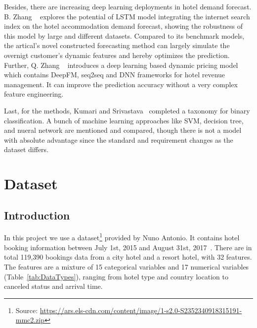 \documentclass[10pt,twocolumn,letterpaper]{article}
\begin{document}
Besides, there are increasing deep learning deployments in hotel demand forecast. B. Zhang \etal~\cite{zhang2019forecasting} explores the potential of LSTM model integrating the internet search index on the hotel accommodation demand forecast, showing the robustness of this model by large and different datasets. Compared to its benchmark models, the artical's novel constructed forecasting method can largely simulate the overnigt customer's dynamic features and hereby optimizes the prediction. Further, Q. Zhang \etal~\cite{Zhang2019Deep} introduces a deep learning based dynamic pricing model which contains DeepFM, seq2seq and DNN frameworks for hotel revenue management. It can improve the prediction accuracy without a very complex feature engineering.

Last, for the methods, Kumari and Srivastava~\cite{kumari2017machine} completed a taxonomy for binary classification. A bunch of machine learning approaches like SVM, decision tree, and nueral network are mentioned and compared, though there is not a model with absolute advantage since the standard and requirement changes as the dataset differs.



\section{Dataset}

\subsection{Introduction}
In this project we use a dataset\footnote{Source:  \url{https://ars.els-cdn.com/content/image/1-s2.0-S2352340918315191-mmc2.zip}} provided by Nuno Antonio. It contains hotel booking information between July 1st, 2015 and August 31st, 2017~\cite{ANTONIO201941}. There are in total 119,390 bookings data from a city hotel and a resort hotel, with 32 features. The features are a mixture of 15 categorical variables and 17 numerical variables (Table~\ref{tab:DataTypes}), ranging from hotel type and country location to canceled status and arrival time. 
\end{document}
